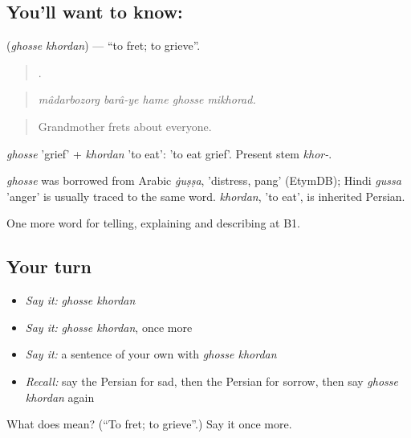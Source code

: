 \subsection*{You'll want to know:  }
\textbf{ } (\emph{ghosse khordan}) — \textquotedblleft{}to fret; to grieve\textquotedblright{}.

\begin{quote}
    .
\end{quote}

\begin{quote}
\emph{mâdarbozorg barâ-ye hame ghosse mikhorad.}
\end{quote}

\begin{quote}
Grandmother frets about everyone.
\end{quote}

\emph{ghosse} 'grief' + \emph{khordan} 'to eat': 'to eat grief'. Present stem \emph{khor-}.

\begin{cousinweb}
\emph{ghosse} was borrowed from Arabic \emph{ġuṣṣa}, 'distress, pang' (EtymDB); Hindi \emph{gussa} 'anger' is usually traced to the same word. \emph{khordan}, 'to eat', is inherited Persian.
\end{cousinweb}

\begin{grammarlens}[title={What you've built}]
One more word for telling, explaining and describing at B1.
\end{grammarlens}

\subsection*{Your turn}
\begin{itemize}
\raggedright
  \item \emph{Say it:} \emph{ghosse khordan}
  \item \emph{Say it:} \emph{ghosse khordan}, once more
  \item \emph{Say it:} a sentence of your own with \emph{ghosse khordan}
  \item \emph{Recall:} say the Persian for sad, then the Persian for sorrow, then say \emph{ghosse khordan} again
\end{itemize}

\begin{tcolorbox}[breakable,colback=teal!4,colframe=teal!35!black,title={Before you move on}]
What does   mean? (\textquotedblleft{}To fret; to grieve\textquotedblright{}.) Say it once more.
\end{tcolorbox}

